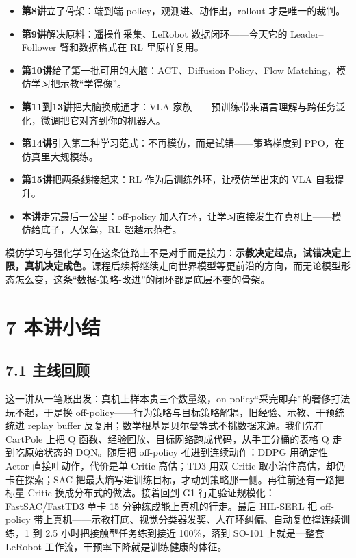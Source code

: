 \documentclass[
  chinese,
]{ctexart}
\providecommand{\tightlist}{%
  \setlength{\itemsep}{0pt}\setlength{\parskip}{0pt}}
\begin{document}
\begin{itemize}
\tightlist
\item
  \textbf{第8讲}立了骨架：端到端 policy，观测进、动作出，rollout
  才是唯一的裁判。
\item
  \textbf{第9讲}解决原料：遥操作采集、LeRobot 数据闭环------今天它的
  Leader--Follower 臂和数据格式在 RL 里原样复用。
\item
  \textbf{第10讲}给了第一批可用的大脑：ACT、Diffusion Policy、Flow
  Matching，模仿学习把示教``学得像''。
\item
  \textbf{第11到13讲}把大脑换成通才：VLA
  家族------预训练带来语言理解与跨任务泛化，微调把它对齐到你的机器人。
\item
  \textbf{第14讲}引入第二种学习范式：不再模仿，而是试错------策略梯度到
  PPO，在仿真里大规模练。
\item
  \textbf{第15讲}把两条线接起来：RL 作为后训练外环，让模仿学出来的 VLA
  自我提升。
\item
  \textbf{本讲}走完最后一公里：off-policy
  加人在环，让学习直接发生在真机上------模仿给底子，人保驾，RL
  超越示范者。
\end{itemize}

模仿学习与强化学习在这条链路上不是对手而是接力：\textbf{示教决定起点，试错决定上限，真机决定成色}。课程后续将继续走向世界模型等更前沿的方向，而无论模型形态怎么变，这条``数据-策略-改进''的闭环都是底层不变的骨架。

\section{7 本讲小结}\label{ux672cux8bb2ux5c0fux7ed3}

\subsection{7.1 主线回顾}\label{ux4e3bux7ebfux56deux987e}

这一讲从一笔账出发：真机上样本贵三个数量级，on-policy``采完即弃''的奢侈打法玩不起，于是换
off-policy------行为策略与目标策略解耦，旧经验、示教、干预统统进 replay
buffer 反复用；数学根基是贝尔曼等式不挑数据来源。我们先在 CartPole 上把
Q 函数、经验回放、目标网络跑成代码，从手工分桶的表格 Q 走到吃原始状态的
DQN。随后把 off-policy 推进到连续动作：DDPG 用确定性 Actor
直接吐动作，代价是单 Critic 高估；TD3 用双 Critic
取小治住高估，却仍卡在探索；SAC
把最大熵写进训练目标，才动到策略那一侧。再往前还有一路把标量 Critic
换成分布式的做法。接着回到 G1 行走验证规模化：FastSAC/FastTD3 单卡 15
分钟练成能上真机的行走。最后 HIL-SERL 把 off-policy
带上真机------示教打底、视觉分类器发奖、人在环纠偏、自动复位撑连续训练，1
到 2.5 小时把接触型任务练到接近 100\%，落到 SO-101 上就是一整套 LeRobot
工作流，干预率下降就是训练健康的体征。
\end{document}
